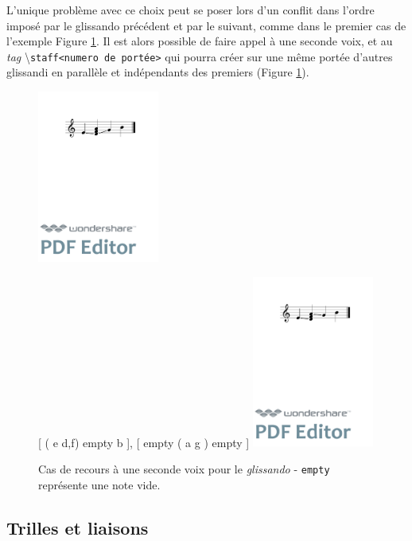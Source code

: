 \documentclass{article}
\newenvironment{gmncode}	{\vspace{-2mm}\small\verbatim}{\endverbatim\vspace{-2mm}}
\newcommand{\code}[1]		{{\small \texttt{#1}}}
\newcommand{\guidotag}[1]	{\textbackslash\code{#1}}
\begin{document}
L'unique problème avec ce choix peut se poser lors d'un conflit dans l'ordre imposé par le glissando précédent et par le suivant, comme dans le premier cas de l'exemple Figure \ref{fig:glissandopb}. Il est alors possible de faire appel à une seconde voix, et au \emph{tag} \guidotag{staff\textless{}numero de portée\textgreater{}} qui pourra créer sur une même portée d'autres glissandi en parallèle et indépendants des premiers (Figure \ref{fig:glissandopb}).


\begin{figure}[h]
\centering
\begin{gmncode}
[ \glissando(e {d,f,a} g) b ]
\end{gmncode}
\includegraphics[width=4cm]{img/glissandopb.pdf}

\begin{gmncode}
{ 
  [ \glissando( e {d,f}) empty b ],
  [  empty \glissando( a g ) empty ] 
}
\end{gmncode}
\includegraphics[width=4cm]{img/glissandosanspb.pdf}
\caption{Cas de recours à une seconde voix pour le \emph{glissando} -
\code{empty} représente une note vide.}
\label{fig:glissandopb}
\end{figure}


\subsection{Trilles et liaisons}\label{subsec:trillesLiaison}
\end{document}
